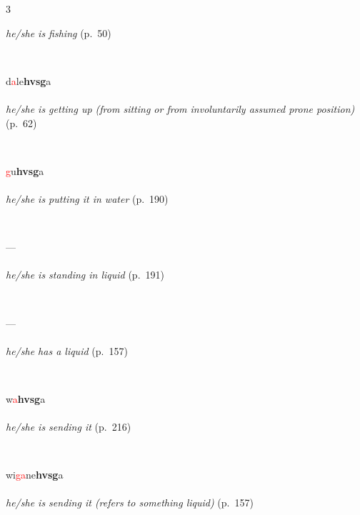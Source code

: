 \documentclass[oneside,openany]{book}%
\begin{document}
\begin{multicols}{3}
\begin{minipage}[t]{\linewidth}
\noindent \textit{he/she is fishing} (p.~50)
\end{minipage}\\[1em]%
\begin{minipage}[t]{\linewidth}
\raggedright\noindent d\textcolor{Red}{a}le\textbf{hvsg}a\\
\\
\noindent \textit{he/she is getting up (from sitting or from involuntarily assumed prone position)} (p.~62)
\end{minipage}\\[1em]%
\begin{minipage}[t]{\linewidth}
\raggedright\noindent \textcolor{Red}{g}u\textbf{hvsg}a\\
\\
\noindent \textit{he/she is putting it in water} (p.~190)
\end{minipage}\\[1em]%
\begin{minipage}[t]{\linewidth}
\raggedright\noindent ---\\
\\
\noindent \textit{he/she is standing in liquid} (p.~191)
\end{minipage}\\[1em]%
\begin{minipage}[t]{\linewidth}
\raggedright\noindent ---\\
\\
\noindent \textit{he/she has a liquid} (p.~157)
\end{minipage}\\[1em]%
\begin{minipage}[t]{\linewidth}
\raggedright\noindent w\textcolor{Red}{a}\textbf{hvsg}a\\
\\
\noindent \textit{he/she is sending it} (p.~216)
\end{minipage}\\[1em]%
\begin{minipage}[t]{\linewidth}
\raggedright\noindent wi\textcolor{Red}{ga}ne\textbf{hvsg}a\\
\\
\noindent \textit{he/she is sending it (refers to something liquid)} (p.~157)
\end{minipage}\\[1em]%
\end{multicols}%
\vspace{1em}%
\needspace{1.5in}%
\end{document}
